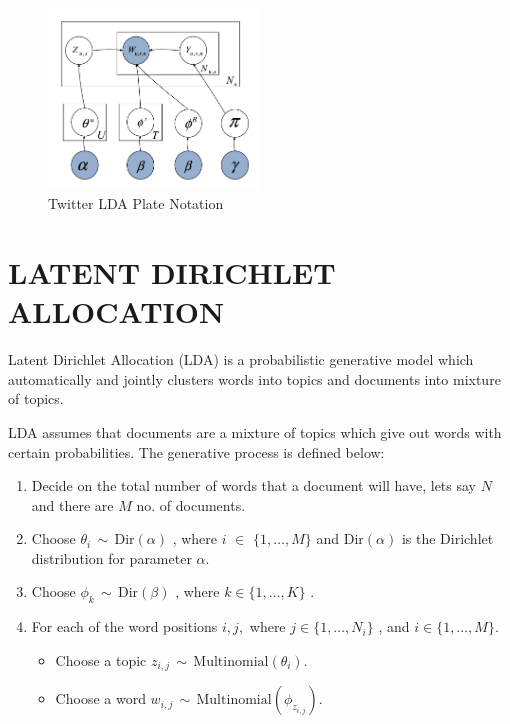  \begin{figure}
 \centering
 \includegraphics[width=0.5\textwidth]{figures/twitter-lda}
 \caption{Twitter LDA Plate Notation}
 \label{fig:plate}
\end{figure}

\section{\uppercase{Latent Dirichlet Allocation}}
Latent Dirichlet Allocation (LDA) is a probabilistic generative model which automatically and jointly clusters words into topics and documents into mixture of topics.

LDA assumes that documents are a mixture of topics which give out words with certain probabilities. The generative process is defined below:
\begin{enumerate}
\item Decide on the total number of words that a document will have, lets say $N$ and there are $M$ no. of documents.
\item Choose $\theta_i \, \sim \, \mathrm{Dir}(\alpha)$ , where $i$ $\in$ $\{ 1,\dots,M \}$ and $\mathrm{Dir}(\alpha)$  is the Dirichlet distribution for parameter $\alpha$.
\item Choose $\phi_k \, \sim \, \mathrm{Dir}(\beta)$ , where  $k \in \{ 1,\dots,K \}$ .
\item For each of the word positions $i, j,$ where  $j \in \{ 1,\dots,N_i \}$ , and  $i \in \{ 1,\dots,M \} $.
\begin{itemize}
\item Choose a topic $z_{i,j} \,\sim\, \mathrm{Multinomial}(\theta_i)$. 
\item Choose a word $w_{i,j} \,\sim\, \mathrm{Multinomial}( \phi_{z_{i,j}})$.
\end{itemize}
\end{enumerate}

